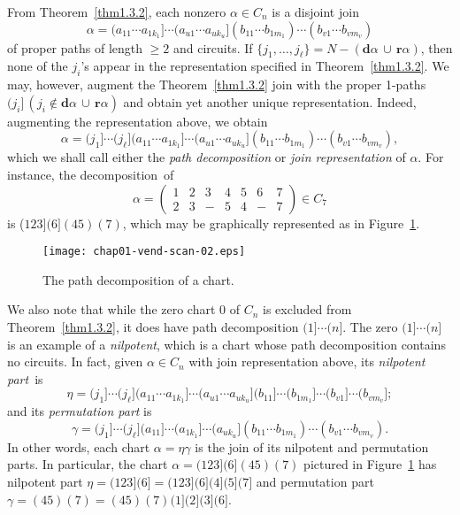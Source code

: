 \documentclass{surv-l}
\numberwithin{equation}{section}
\numberwithin{table}{section}
\numberwithin{figure}{section}
\theoremstyle{definition}
\begin{document}
From Theorem~\ref{thm1.3.2}, each nonzero
$\alpha\in C_{n}$ is a disjoint join
\[
\alpha=(a_{11}\cdots a_{1k_{1}}]\cdots(a_{u1}\cdots a_{uk_{u}}]
(b_{11}\cdots b_{1m_{1}})\cdots(b_{v1}\cdots b_{vm_{v}})
\]
of proper paths of length $\geq 2$ and circuits. If
$\{j_{1},\ldots, j_{\ell}\}=N-(\mathbf{d}\alpha\,\cup\,
\mathbf{r}\alpha)$, then none of the $j_{i}$'s appear in the
representation specified in Theorem~\ref{thm1.3.2}. We may,
however, augment the Theorem~\ref{thm1.3.2} join with the proper
1-paths $(j_{i}]\,(j_{i}\not\in \mathbf{d}\alpha\,\cup\,
\mathbf{r}\alpha)$ and obtain yet another unique representation.
Indeed, augmenting the representation above, we
obtain\index{$\ell$}
\[
\alpha=(j_{1}]\cdots(j_{\ell}](a_{11}\cdots
a_{1k_{1}}]\cdots(a_{u1}\cdots a_{uk_{u}}](b_{11}\cdots
b_{1m_{1}})\cdots(b_{v1}\cdots b_{vm_{v}}),
\]
which we shall call either the \emph{path
decomposition} or \emph{join
representation} of $\alpha$.
For instance, the decomposition~of
\[
\alpha=\left(\begin{matrix}
1 & 2 & 3 & 4 & 5 & 6 & 7\\
2 & 3 & - & 5 & 4 & - & 7
\end{matrix}\right)\in C_{7}
\]
is ($123](6](45)(7)$, which may be graphically represented as in
Figure~\ref{fig1.3.3}.

\setcounter{figure}{2}
\begin{figure}[!h]
\texttt{[image: chap01-vend-scan-02.eps]}
\caption{The path decomposition of a chart.\label{fig1.3.3}}
\end{figure}

We also note that while the zero chart $0$ of
$C_{n}$ is excluded from Theorem~\ref{thm1.3.2}, it does have path
decomposition $(1]\cdots (n]$. The zero $(1]\cdots (n]$ is an
example of a \emph{nilpotent}, which is a chart whose path
decomposition contains no circuits. In fact, given $\alpha\in
C_{n}$ with join representation above, its \emph{nilpotent
part}~is
\[
\eta=(j_{1}]\cdots(j_{\ell}](a_{11}\cdots
a_{1k_{1}}]\cdots(a_{u1}\cdots
a_{uk_{u}}](b_{11}]\cdots(b_{1m_{1}}]\cdots(b_{v1}]\cdots(b_{vm_{v}}];
\]
and its \emph{permutation part} is
\[
\gamma=(j_{1}]\cdots(j_{\ell}](a_{11}]\cdots(a_{1k_{1}}]\cdots(a_{uk_{u}}](b_{11}\cdots
b_{1m_{1}})\cdots(b_{v1}\cdots b_{vm_{v}}).
\]
In other words, each chart $\alpha=\eta\gamma$ is the join of its
nilpotent and permutation parts. In
particular, the chart $\alpha=(123](6](45)(7)$ pictured in
Figure~\ref{fig1.3.3} has nilpotent part
$\eta=(123](6]=(123](6](4](5](7]$ and permutation part
$\gamma=(45)(7)=(45)(7)(1](2](3](6]$.
\end{document}
